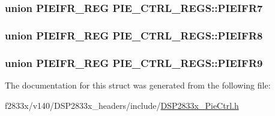 \subsubsection[{P\+I\+E\+I\+F\+R7}]{\setlength{\rightskip}{0pt plus 5cm}union {\bf P\+I\+E\+I\+F\+R\+\_\+\+R\+E\+G} P\+I\+E\+\_\+\+C\+T\+R\+L\+\_\+\+R\+E\+G\+S\+::\+P\+I\+E\+I\+F\+R7}\label{struct_p_i_e___c_t_r_l___r_e_g_s_a9a425b20d1948604bbd6d33d8736e3e3}
\hypertarget{struct_p_i_e___c_t_r_l___r_e_g_s_aa2781ee9d3dcfbbaac1819e8680349ac}{}
\subsubsection[{P\+I\+E\+I\+F\+R8}]{\setlength{\rightskip}{0pt plus 5cm}union {\bf P\+I\+E\+I\+F\+R\+\_\+\+R\+E\+G} P\+I\+E\+\_\+\+C\+T\+R\+L\+\_\+\+R\+E\+G\+S\+::\+P\+I\+E\+I\+F\+R8}\label{struct_p_i_e___c_t_r_l___r_e_g_s_aa2781ee9d3dcfbbaac1819e8680349ac}
\hypertarget{struct_p_i_e___c_t_r_l___r_e_g_s_a97908d0d02161ce3e59515707aace6c4}{}
\subsubsection[{P\+I\+E\+I\+F\+R9}]{\setlength{\rightskip}{0pt plus 5cm}union {\bf P\+I\+E\+I\+F\+R\+\_\+\+R\+E\+G} P\+I\+E\+\_\+\+C\+T\+R\+L\+\_\+\+R\+E\+G\+S\+::\+P\+I\+E\+I\+F\+R9}\label{struct_p_i_e___c_t_r_l___r_e_g_s_a97908d0d02161ce3e59515707aace6c4}


The documentation for this struct was generated from the following file\+:\begin{DoxyCompactItemize}
\item 
f2833x/v140/\+D\+S\+P2833x\+\_\+headers/include/\hyperlink{_d_s_p2833x___pie_ctrl_8h}{D\+S\+P2833x\+\_\+\+Pie\+Ctrl.\+h}\end{DoxyCompactItemize}
